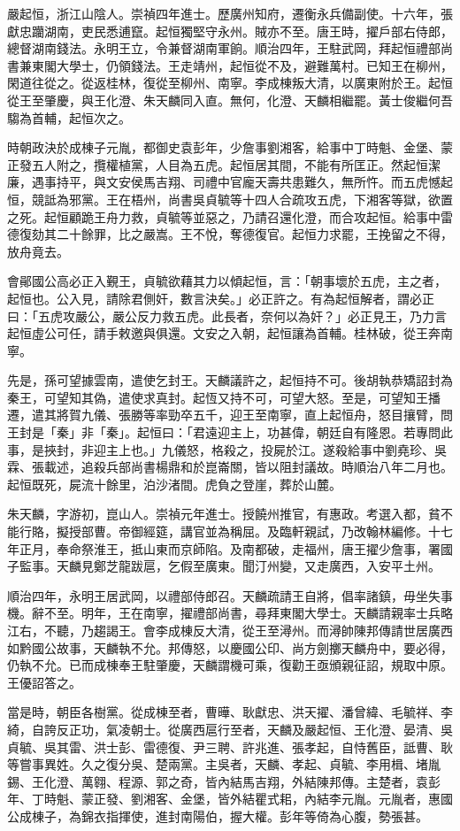 \begin{pinyinscope}
嚴起恒，浙江山陰人。崇禎四年進士。歷廣州知府，遷衡永兵備副使。十六年，張獻忠躪湖南，吏民悉逋竄。起恒獨堅守永州。賊亦不至。唐王時，擢戶部右侍郎，總督湖南錢法。永明王立，令兼督湖南軍餉。順治四年，王駐武岡，拜起恒禮部尚書兼東閣大學士，仍領錢法。王走靖州，起恒從不及，避難萬村。已知王在柳州，閑道往從之。從返桂林，復從至柳州、南寧。李成棟叛大清，以廣東附於王。起恒從王至肇慶，與王化澄、朱天麟同入直。無何，化澄、天麟相繼罷。黃士俊繼何吾騶為首輔，起恒次之。

時朝政決於成棟子元胤，都御史袁彭年，少詹事劉湘客，給事中丁時魁、金堡、蒙正發五人附之，攬權植黨，人目為五虎。起恒居其間，不能有所匡正。然起恒潔廉，遇事持平，與文安侯馬吉翔、司禮中官龐天壽共患難久，無所忤。而五虎憾起恒，競詆為邪黨。王在梧州，尚書吳貞毓等十四人合疏攻五虎，下湘客等獄，欲置之死。起恒顧跪王舟力救，貞毓等並惡之，乃請召還化澄，而合攻起恒。給事中雷德復劾其二十餘罪，比之嚴嵩。王不悅，奪德復官。起恒力求罷，王挽留之不得，放舟竟去。

會鄖國公高必正入覲王，貞毓欲藉其力以傾起恒，言：「朝事壞於五虎，主之者，起恒也。公入見，請除君側奸，數言決矣。」必正許之。有為起恒解者，謂必正曰：「五虎攻嚴公，嚴公反力救五虎。此長者，奈何以為奸？」必正見王，乃力言起恒虛公可任，請手敕邀與俱還。文安之入朝，起恒讓為首輔。桂林破，從王奔南寧。

先是，孫可望據雲南，遣使乞封王。天麟議許之，起恒持不可。後胡執恭矯詔封為秦王，可望知其偽，遣使求真封。起恆又持不可，可望大怒。至是，可望知王播遷，遣其將賀九儀、張勝等率勁卒五千，迎王至南寧，直上起恒舟，怒目攘臂，問王封是「秦」非「秦」。起恒曰：「君遠迎主上，功甚偉，朝廷自有隆恩。若專問此事，是挾封，非迎主上也。」九儀怒，格殺之，投屍於江。遂殺給事中劉堯珍、吳霖、張載述，追殺兵部尚書楊鼎和於崑崙關，皆以阻封議故。時順治八年二月也。起恒既死，屍流十餘里，泊沙渚間。虎負之登崖，葬於山麓。

朱天麟，字游初，崑山人。崇禎元年進士。授饒州推官，有惠政。考選入都，貧不能行賂，擬授部曹。帝御經筵，講官並為稱屈。及臨軒親試，乃改翰林編修。十七年正月，奉命祭淮王，抵山東而京師陷。及南都破，走福州，唐王擢少詹事，署國子監事。天麟見鄭芝龍跋扈，乞假至廣東。聞汀州變，又走廣西，入安平土州。

順治四年，永明王居武岡，以禮部侍郎召。天麟疏請王自將，倡率諸鎮，毋坐失事機。辭不至。明年，王在南寧，擢禮部尚書，尋拜東閣大學士。天麟請親率士兵略江右，不聽，乃趨謁王。會李成棟反大清，從王至潯州。而潯帥陳邦傳請世居廣西如黔國公故事，天麟執不允。邦傳怒，以慶國公印、尚方劍擲天麟舟中，要必得，仍執不允。已而成棟奉王駐肇慶，天麟謂機可乘，復勸王亟頒親征詔，規取中原。王優詔答之。

當是時，朝臣各樹黨。從成棟至者，曹曄、耿獻忠、洪天擢、潘曾緯、毛毓祥、李綺，自誇反正功，氣凌朝士。從廣西扈行至者，天麟及嚴起恒、王化澄、晏清、吳貞毓、吳其雷、洪士彭、雷德復、尹三聘、許兆進、張孝起，自恃舊臣，詆曹、耿等嘗事異姓。久之復分吳、楚兩黨。主吳者，天麟、孝起、貞毓、李用楫、堵胤錫、王化澄、萬翱、程源、郭之奇，皆內結馬吉翔，外結陳邦傳。主楚者，袁彭年、丁時魁、蒙正發、劉湘客、金堡，皆外結瞿式耜，內結李元胤。元胤者，惠國公成棟子，為錦衣指揮使，進封南陽伯，握大權。彭年等倚為心腹，勢張甚。


\end{pinyinscope}

